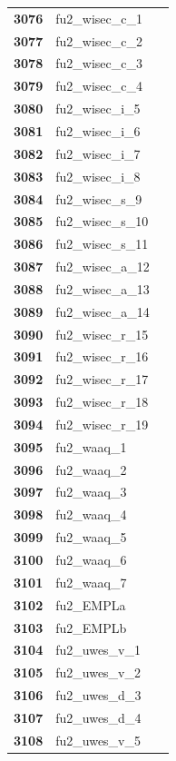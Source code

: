 \documentclass[
  letterpaper,
  DIV=11,
  numbers=noendperiod]{scrartcl}
\begin{document}
\begin{longtable}[t]{>{}cll}
\textbf{3076} & fu2\_wisec\_c\_1 & \\
\textbf{3077} & fu2\_wisec\_c\_2 & \\
\textbf{3078} & fu2\_wisec\_c\_3 & \\
\textbf{3079} & fu2\_wisec\_c\_4 & \\
\textbf{3080} & fu2\_wisec\_i\_5 & \\
\addlinespace
\textbf{3081} & fu2\_wisec\_i\_6 & \\
\textbf{3082} & fu2\_wisec\_i\_7 & \\
\textbf{3083} & fu2\_wisec\_i\_8 & \\
\textbf{3084} & fu2\_wisec\_s\_9 & \\
\textbf{3085} & fu2\_wisec\_s\_10 & \\
\addlinespace
\textbf{3086} & fu2\_wisec\_s\_11 & \\
\textbf{3087} & fu2\_wisec\_a\_12 & \\
\textbf{3088} & fu2\_wisec\_a\_13 & \\
\textbf{3089} & fu2\_wisec\_a\_14 & \\
\textbf{3090} & fu2\_wisec\_r\_15 & \\
\addlinespace
\textbf{3091} & fu2\_wisec\_r\_16 & \\
\textbf{3092} & fu2\_wisec\_r\_17 & \\
\textbf{3093} & fu2\_wisec\_r\_18 & \\
\textbf{3094} & fu2\_wisec\_r\_19 & \\
\textbf{3095} & fu2\_waaq\_1 & \\
\addlinespace
\textbf{3096} & fu2\_waaq\_2 & \\
\textbf{3097} & fu2\_waaq\_3 & \\
\textbf{3098} & fu2\_waaq\_4 & \\
\textbf{3099} & fu2\_waaq\_5 & \\
\textbf{3100} & fu2\_waaq\_6 & \\
\addlinespace
\textbf{3101} & fu2\_waaq\_7 & \\
\textbf{3102} & fu2\_EMPLa & \\
\textbf{3103} & fu2\_EMPLb & \\
\textbf{3104} & fu2\_uwes\_v\_1 & \\
\textbf{3105} & fu2\_uwes\_v\_2 & \\
\addlinespace
\textbf{3106} & fu2\_uwes\_d\_3 & \\
\textbf{3107} & fu2\_uwes\_d\_4 & \\
\textbf{3108} & fu2\_uwes\_v\_5 & \\

\end{longtable}
\end{document}
